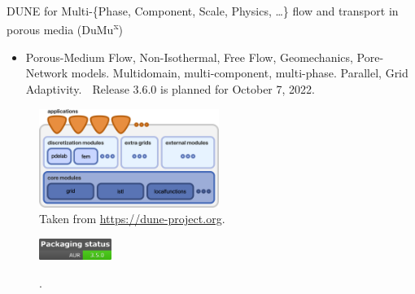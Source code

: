 \begin{frame}
\begin{alertblock}{DUNE for Multi-\{Phase, Component, Scale, Physics, \ldots\} flow and transport in porous media (DuMu\textsuperscript{x})}
\begin{itemize}
			\item

			      Porous-Medium Flow, Non-Isothermal, Free Flow, Geomechanics, Pore-Network models.
			      Multidomain, multi-component, multi-phase. Parallel, Grid Adaptivity.
				      {🎉}
			      Release 3.6.0 is planned for October 7, 2022.

		\end{itemize}
	\end{alertblock}

	\begin{minipage}{0.45\textwidth}
		\begin{figure}[ht!]
			\centering
			\includegraphics[height=3.2cm]{dunedesign}
			\caption{Taken from \url{https://dune-project.org}.}
		\end{figure}
	\end{minipage}
	\begin{minipage}{0.45\textwidth}
		\begin{figure}[ht!]
			\centering
			\href{https://repology.org/project/dumux/versions}{\includegraphics[height=0.7cm]{dumux-repology}} %
			\caption{.}
		\end{figure}
	\end{minipage}

\end{frame}

